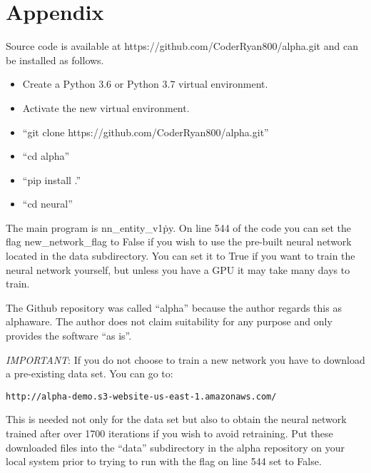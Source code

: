 \documentclass{article}
\begin{document}
\section{Appendix}

Source code is available at https://github.com/CoderRyan800/alpha.git and
can be installed as follows.

\begin{itemize}
\item Create a Python 3.6 or Python 3.7 virtual environment.
\item Activate the new virtual environment.
\item ``git clone https://github.com/CoderRyan800/alpha.git''
\item ``cd alpha''
\item ``pip install .''
\item ``cd neural''
\end{itemize}

The main program is nn\_entity\_v1\.py.  On line 544 of the code you can
set the flag new\_network\_flag to False if you wish to use the pre-built
neural network located in the data subdirectory.  You can set it to True
if you want to train the neural network yourself, but unless you have a GPU
it may take many days to train.

The Github repository was called ``alpha'' because the author regards this
as alphaware.  The author does not claim suitability for any purpose and
only provides the software ``as is''.

\emph{IMPORTANT}: If you do not choose to train a new network you have to
download a pre-existing data set.  You can go to:
\begin{verbatim}
http://alpha-demo.s3-website-us-east-1.amazonaws.com/
\end{verbatim}
This is
needed not only for the data set but also to obtain the neural network
trained after over 1700 iterations if you wish to avoid retraining.
Put these downloaded files into the ``data'' subdirectory in the
alpha repository on your local system prior to trying to run with the
flag on line 544 set to False.




\end{document}
